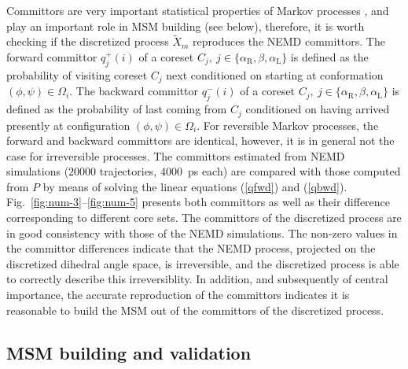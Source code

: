 \documentclass[aps, pre, preprint,unsortedaddress,a4paper,onecolumn]{revtex4}
\newcommand{\fwd}[0]{+}
\newcommand{\bwd}[0]{-}
\newcommand{\confaa}[0]{{\alpha_{\textrm{R}}}}
\newcommand{\confc}[0]{{\alpha_{\textrm{L}}}}
\begin{document}
Committors are very important statistical properties of Markov processes \cite{PrinzHeldSmithNoe_Committorprep,PNAS09}, and play
an important role in MSM building \cite{A19-31,A19-29,djurdjevac2010markov} (see below), therefore, it is worth
checking if the discretized process $\tilde X_m$ reproduces the NEMD committors.
The forward committor $q^\fwd_j(i)$ of a coreset $C_j,\
j\in\{\confaa, \beta, \confc\}$ is defined as the probability of
visiting coreset $C_j$ next conditioned on starting at conformation
$(\phi,\psi)\in\Omega_i$.  The backward committor $q^\bwd_j(i)$ of a
coreset $C_j,\ j\in\{\confaa, \beta, \confc\}$ is defined as the
probability of last coming from $C_j$ conditioned on having arrived presently at
configuration $(\phi,\psi)\in\Omega_i$.
For reversible Markov processes, the
forward and backward committors are identical, however, it is in
general not the case for irreversible processes.
The committors estimated from NEMD simulations ($20000$ trajectories, $4000$~ps each) are compared with
those computed from $P$ by means of solving the linear equations (\ref{qfwd}) and (\ref{qbwd}).
Fig.~\ref{fig:num-3}--\ref{fig:num-5} presents both
committors as well as their difference corresponding to different core sets.
The committors of the discretized process are in good consistency with those of
the NEMD simulations. The non-zero values in the committor differences
indicate that the NEMD process, projected on the discretized
dihedral angle space, is irreversible, and
the discretized process is able to correctly describe this irreversiblity.
In addition, and subsequently of central importance, the accurate reproduction of the committors indicates it is reasonable to build the 
MSM out of the committors of the  discretized process.



\subsection{MSM building and validation}
\end{document}
